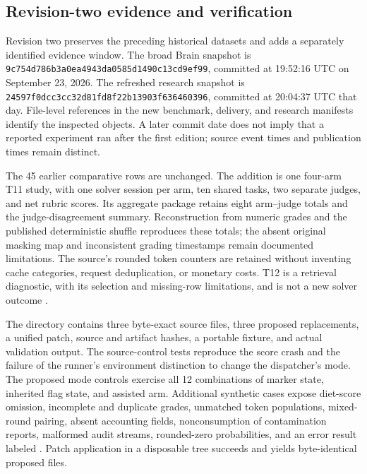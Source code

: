 \subsection{Revision-two evidence and verification}
\label{app:update}

Revision two preserves the preceding historical datasets and adds a separately identified evidence window. The broad Brain snapshot is
\texttt{9c754d786b3a0ea4943d}\allowbreak\texttt{a0585d1490c13cd9ef99},
committed at 19:52:16 UTC on September 23, 2026. The refreshed research snapshot is
\texttt{24597f0dcc3cc32d81fd}\allowbreak\texttt{8f22b13903f636460396},
committed at 20:04:37 UTC that day. File-level references in the new benchmark, delivery, and research manifests identify the inspected objects. A later commit date does not imply that a reported experiment ran after the first edition; source event times and publication times remain distinct.

The 45 earlier comparative rows are unchanged. The addition is one four-arm T11 study, with one solver session per arm, ten shared tasks, two separate judges, and net rubric scores. Its aggregate package retains eight arm--judge totals and the judge-disagreement summary. Reconstruction from numeric grades and the published deterministic shuffle reproduces these totals; the absent original masking map and inconsistent grading timestamps remain documented limitations. The source's rounded token counters are retained without inventing cache categories, request deduplication, or monetary costs. T12 is a retrieval diagnostic, with its selection and missing-row limitations, and is not a new solver outcome \citep{benchmark_update_t11_result,benchmark_update_t12_result}.

The directory  contains three byte-exact source files, three proposed replacements, a unified patch, source and artifact hashes, a portable fixture, and actual validation output. The source-control tests reproduce the score crash and the failure of the runner's environment distinction to change the dispatcher's mode. The proposed mode controls exercise all 12 combinations of marker state, inherited flag state, and assisted arm. Additional synthetic cases expose diet-score omission, incomplete and duplicate grades, unmatched token populations, mixed-round pairing, absent accounting fields, nonconsumption of contamination reports, malformed audit streams, rounded-zero probabilities, and an error result labeled . Patch application in a disposable tree succeeds and yields byte-identical proposed files.

